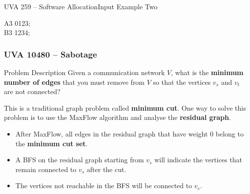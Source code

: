 \begin{frame}{UVA 259 -- Software Allocation}{Input Example Two}

A3 0123;\\
B3 1234;\\
 \begin{center}
 \end{center}
\end{frame}

\begin{frame}
  \frametitle{UVA 10480 -- Sabotage}
  \begin{block}{Problem Description}
    Given a communication network $V$, what is the {\bf minimum number of edges} that you must remove from $V$ so that the vertices $v_s$ and $v_t$ are not connected?
  \end{block}\bigskip

  This is a traditional graph problem called {\bf minimum cut}. One way to solve this problem is to use the MaxFlow algorithm and analyse the {\bf residual graph}.\bigskip

  \begin{itemize}
    \item After MaxFlow, all edges in the residual graph that have weight $0$ belong to the {\bf minimum cut set}.
    \item A BFS on the residual graph starting from $v_s$ will indicate the vertices that remain connected to $v_s$ after the cut.
    \item The vertices not reachable in the BFS will be connected to $v_e$.
  \end{itemize}
\end{frame}

